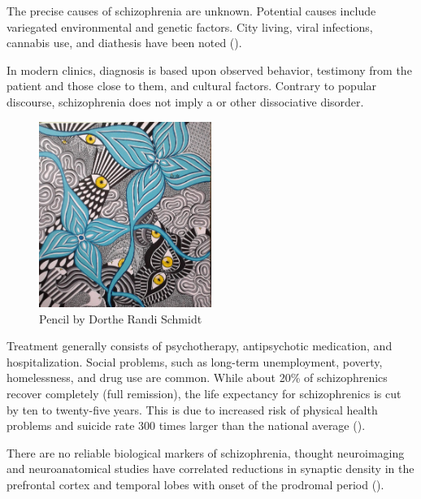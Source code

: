 \documentclass[]{article}
\begin{document}
		The precise causes of schizophrenia are unknown. Potential causes include variegated environmental and genetic factors. City living, viral infections, cannabis use, and diathesis have been noted (\cite{HinchliffSynthesisphylogenytaxonomy2015,ChadwickCannabisUseAdolescent2013}).
		
		In modern clinics, diagnosis is based upon observed behavior, testimony from the patient and those close to them, and cultural factors. Contrary to popular discourse, schizophrenia does not imply a  or other dissociative disorder.
		
		\begin{figure}
			\centering
			\includegraphics[width=0.5\textwidth]{graphics/DortheRandiSchmidt3}
			\caption{Pencil by Dorthe Randi Schmidt}
		\end{figure}
		
		Treatment generally consists of psychotherapy, antipsychotic medication, and hospitalization. Social problems, such as long-term unemployment, poverty, homelessness, and drug use are common. While about 20\% of schizophrenics recover completely (full remission), the life expectancy for schizophrenics is cut by ten to twenty-five years. This is due to increased risk of physical health problems and suicide rate 300 times larger than the national average (\cite{HinchliffSynthesisphylogenytaxonomy2015,FosterHomelessnessSchizophrenia2012,OsSchizophrenia2009}).
		
		There are no reliable biological markers of schizophrenia, thought neuroimaging and neuroanatomical studies have correlated reductions in synaptic density in the prefrontal cortex and temporal lobes with onset of the prodromal period (\cite{RimolCorticalThicknessSubcortical2010,GlantzLADecreaseddendriticspine2000,HillMolecularmechanismscontributing2006,BuckleyNeuroimagingschizophreniastructural2005,FaludiSynapticchangesbrain2011,BoksaAbnormalsynapticpruning2012,PalaniyappanStructuralcorrelatesformal2015}).
		
\end{document}
